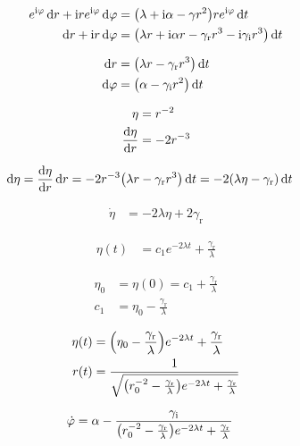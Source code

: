 \documentclass[a4paper,10pt]{article}
\newcommand{\mi}{\mathrm{i}}
\newcommand{\gammar}{\gamma_{\text{r}}}
\newcommand{\gammai}{\gamma_{\text{i}}}
\begin{document}
\begin{align}
	e^{\mi\varphi}
	\dd{r}
	+
	\mi
	r
	e^{\mi\varphi}
	\dd{\varphi}
	&=
	\pqty{\lambda+\mi\alpha-\gamma r^2}
	r e^{\mi\varphi}
	\dd{t}
\\
	\dd{r}
	+
	\mi
	r
	\dd{\varphi}
	&=
	\pqty{
		\lambda r
		+
		\mi\alpha r
		-
		\gammar r^3
		-
		\mi\gammai r^3
	}
	\dd{t}
\end{align}

\begin{align}
	\dd{r}
	&=
	\pqty{\lambda r-\gammar r^3}
	\dd{t}
\\
	\dd{\varphi}
	&=
	\pqty{
		\alpha
		-
		\gammai
		r^2
	}	
	\dd{t}
\end{align}

\begin{align}
	\eta
	&=
	r^{-2}
\\
	\dv{\eta}{r}
	&=
	-2r^{-3}
\end{align}

\begin{align}
	\dd{\eta}
	&=
	\dv{\eta}{r}
	\dd{r}
	=
	-2r^{-3}
	\pqty{\lambda r-\gammar r^3}
	\dd{t}
	=
	-2
	\pqty{\lambda\eta-\gammar }
	\dd{t}
\end{align}

\begin{align}
	\dot{\eta}
	&=
	-2
	\lambda\eta
	+
	2
	\gammar
\end{align}

\begin{align}
	\eta(t)
	&=
	c_1
	e^{-2\lambda t}
	+
	\frac{\gammar}{\lambda}
\end{align}

\begin{align}
	\eta_0
	&=
	\eta(0)
	=
	c_1
	+
	\frac{\gammar}{\lambda}
\\
	c_1
	&=
	\eta_0
	-
	\frac{\gammar}{\lambda}		
\end{align}

\begin{align}
	\eta(t)
	&=
	\pqty{
		\eta_0
		-
		\frac{\gammar}{\lambda}	
	}
	e^{-2\lambda t}
	+
	\frac{\gammar}{\lambda}
\\
	r(t)
	&=
	\frac{1}{
		\sqrt{
			\pqty{
				r_0^{-2}
				-
				\frac{\gammar}{\lambda}	
			}
			e^{-2\lambda t}
			+
			\frac{\gammar}{\lambda}
		}	
	}
\end{align}

\begin{align}
	\dot{\varphi}
	&=
	\alpha
	-
	\frac{\gammai}
	{
		\pqty{
			r_0^{-2}
			-
			\frac{\gammar}{\lambda}	
		}
		e^{-2\lambda t}
		+
		\frac{\gammar}{\lambda}	
	}
\end{align}
\end{document}
